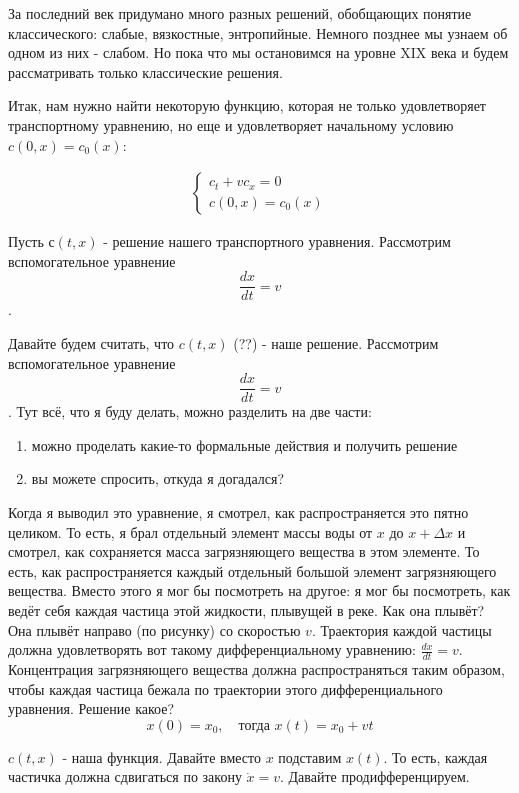 За последний век придумано много разных решений, обобщающих понятие классического: слабые, вязкостные, энтропийные. Немного позднее мы узнаем об одном из них - слабом. Но пока что мы остановимся на уровне XIX века и будем рассматривать только классические решения.

Итак, нам нужно найти некоторую функцию, которая не только удовлетворяет транспортному уравнению, но еще и удовлетворяет начальному условию $ c (0, x) = c_0 (x) $:

\begin{align}
    \begin{cases} 
        c_t + v c_x  =0 \\
        c (0, x) = c_0 (x)
    \end{cases}
\label{transport}
\end{align}

Пусть $ с (t, x) $ - решение нашего транспортного уравнения. Рассмотрим вспомогательное уравнение $$ \frac {dx} {dt} = v $$.

\pagebreak

Давайте будем считать, что $ c(t, x) $ (??) - наше решение. Рассмотрим вспомогательное уравнение $$ \frac {dx} {dt} = v $$. Тут всё, что я буду делать, можно разделить на две части:
\begin{enumerate}
\item можно проделать какие-то формальные действия и получить решение
\item вы можете спросить, откуда я догадался?
\end{enumerate}

Когда я выводил это уравнение, я смотрел, как распространяется это пятно целиком. То есть, я брал отдельный элемент массы воды от $x$ до $ x + \Delta x $ и смотрел, как сохраняется масса загрязняющего вещества в этом элементе. То есть, как распространяется каждый отдельный большой элемент загрязняющего вещества. Вместо этого я мог бы посмотреть на другое: я мог бы посмотреть, как ведёт себя каждая частица этой жидкости, плывущей в реке. Как она плывёт? Она плывёт направо (по рисунку) со скоростью $v$. Траектория каждой частицы должна удовлетворять вот такому дифференциальному уравнению: $ \displaystyle \frac {dx} {dt} = v $. Концентрация загрязняющего вещества должна распространяться таким образом, чтобы каждая частица бежала по траектории этого дифференциального уравнения.
Решение какое?
$$ x(0) = x_0,\quad \text{тогда }x(t) = x_0 + v t $$

$c (t, x)$ - наша функция. Давайте вместо $x$ подставим $ x(t) $. То есть, каждая частичка должна сдвигаться по закону $\dot x = v$. Давайте продифференцируем.

